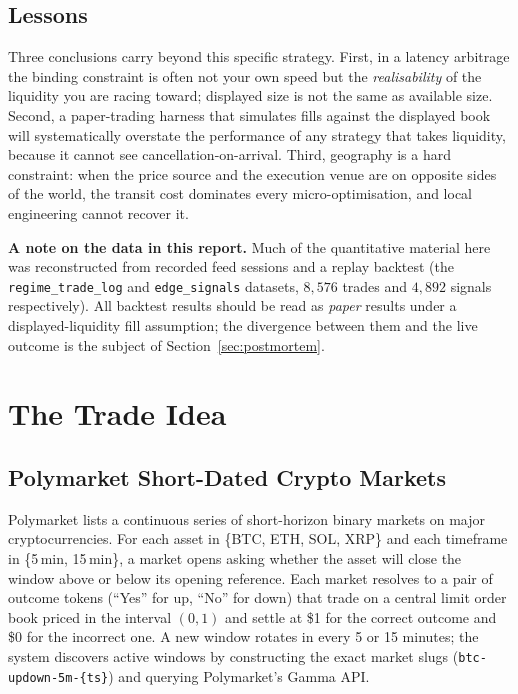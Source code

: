 \documentclass{tmsce}
\let\oldsection\section
\renewcommand{\section}{\clearpage\oldsection}
\begin{document}
\subsection{Lessons}

Three conclusions carry beyond this specific strategy. First, in a latency
arbitrage the binding constraint is often not your own speed but the
\emph{realisability} of the liquidity you are racing toward; displayed size is not
the same as available size. Second, a paper-trading harness that simulates fills
against the displayed book will systematically overstate the performance of any
strategy that takes liquidity, because it cannot see cancellation-on-arrival. Third,
geography is a hard constraint: when the price source and the execution venue are on
opposite sides of the world, the transit cost dominates every micro-optimisation, and
local engineering cannot recover it.

\medskip
\noindent\textbf{A note on the data in this report.} Much of the quantitative
material here was reconstructed from recorded feed sessions and a replay backtest
(the \texttt{regime\_trade\_log} and \texttt{edge\_signals} datasets, $8{,}576$
trades and $4{,}892$ signals respectively). All backtest results should be read as
\emph{paper} results under a displayed-liquidity fill assumption; the divergence
between them and the live outcome is the subject of Section~\ref{sec:postmortem}.


\section{The Trade Idea}
\label{sec:trade-idea}

\subsection{Polymarket Short-Dated Crypto Markets}

Polymarket lists a continuous series of short-horizon binary markets on major
cryptocurrencies. For each asset in \{BTC, ETH, SOL, XRP\} and each timeframe in
\{5\,min, 15\,min\}, a market opens asking whether the asset will close the window
above or below its opening reference. Each market resolves to a pair of outcome
tokens (``Yes'' for up, ``No'' for down) that trade on a central limit order book
priced in the interval $(0,1)$ and settle at \$1 for the correct outcome and \$0 for
the incorrect one. A new window rotates in every 5 or 15 minutes; the system
discovers active windows by constructing the exact market slugs
(\texttt{btc-updown-5m-\{ts\}}) and querying Polymarket's Gamma API.
\end{document}
